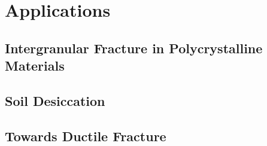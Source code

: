 \section{Applications}

\sectioncover

\subsection{Intergranular Fracture in Polycrystalline Materials}
\subsectioncover

\begin{frame}
\end{frame}

\subsection{Soil Desiccation}
\subsectioncover

\begin{frame}
\end{frame}

\subsection{Towards Ductile Fracture}
\subsectioncover

\begin{frame}
\end{frame}
